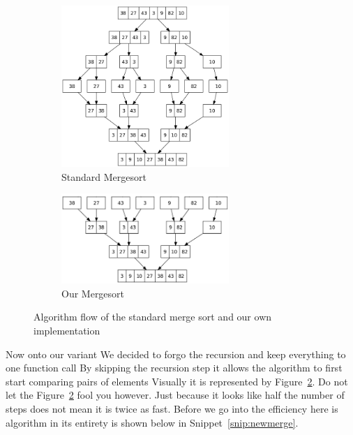 \documentclass[12pt]{article}
\begin{document}
	
\begin{figure}[H]
	
	\begin{subfigure}{0.5\textwidth}
		\includegraphics[width=2.5in]{Merge_sort_algorithm_diagram.png} 
		\caption{Standard Mergesort}
		\label{fig:stdmerge}
	\end{subfigure}
	\begin{subfigure}{0.5\textwidth}
		\includegraphics[width=2.5in]{New_merge_sort_algorithm_diagram.png}
		\caption{Our Mergesort}
		\label{fig:newmerge}
	\end{subfigure}
	
	\caption{Algorithm flow of the standard merge sort and our own implementation}
	\label{fig:bothmerge}
\end{figure}
	
	Now onto our variant
	We decided to forgo the recursion and keep everything to one function call
	By skipping the recursion step it allows the algorithm to first start comparing pairs of elements
	Visually it is represented by Figure~\ref{fig:newmerge}.
	Do not let the Figure~\ref{fig:newmerge} fool you however.
	Just because it looks like half the number of steps does not mean it is twice as fast.
	Before we go into the efficiency here is algorithm in its entirety is shown below in Snippet~\ref{snip:newmerge}.
	
\end{document}
